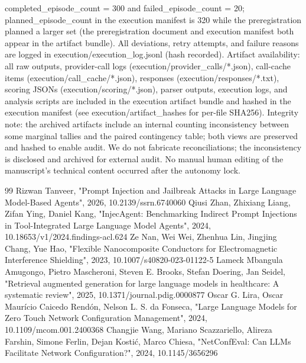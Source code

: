 \documentclass[conference]{IEEEtran}
\begin{document}
completed\_episode\_count = 300 and failed\_episode\_count = 20; planned\_episode\_count in the execution manifest is 320 while the preregistration planned a larger set (the preregistration document and execution manifest both appear in the artifact bundle). All deviations, retry attempts, and failure reasons are logged in execution/execution\_log.jsonl (hash recorded). Artifact availability: all raw outputs, provider-call logs (execution/provider\_calls/*.json), call-cache items (execution/call\_cache/*.json), responses (execution/responses/*.txt), scoring JSONs (execution/scoring/*.json), parser outputs, execution logs, and analysis scripts are included in the execution artifact bundle and hashed in the execution manifest (see execution/artifact\_hashes for per-file SHA256). Integrity note: the archived artifacts include an internal counting inconsistency between some marginal tallies and the paired contingency table; both views are preserved and hashed to enable audit. We do not fabricate reconciliations; the inconsistency is disclosed and archived for external audit. No manual human editing of the manuscript's technical content occurred after the autonomy lock.

\begin{thebibliography}{99}
 Rizwan Tanveer, "Prompt Injection and Jailbreak Attacks in Large Language Model-Based Agents", 2026, 10.2139/ssrn.6740060
 Qiusi Zhan, Zhixiang Liang, Zifan Ying, Daniel Kang, "InjecAgent: Benchmarking Indirect Prompt Injections in Tool-Integrated Large Language Model Agents", 2024, 10.18653/v1/2024.findings-acl.624
 Ze Nan, Wei Wei, Zhenhua Lin, Jingjing Chang, Yue Hao, "Flexible Nanocomposite Conductors for Electromagnetic Interference Shielding", 2023, 10.1007/s40820-023-01122-5
 Lameck Mbangula Amugongo, Pietro Mascheroni, Steven E. Brooks, Stefan Doering, Jan Seidel, "Retrieval augmented generation for large language models in healthcare: A systematic review", 2025, 10.1371/journal.pdig.0000877
 Oscar G. Lira, Oscar Maurício Caicedo Rendón, Nelson L. S. da Fonseca, "Large Language Models for Zero Touch Network Configuration Management", 2024, 10.1109/mcom.001.2400368
 Changjie Wang, Mariano Scazzariello, Alireza Farshin, Simone Ferlin, Dejan Kostić, Marco Chiesa, "NetConfEval: Can LLMs Facilitate Network Configuration?", 2024, 10.1145/3656296
\end{thebibliography}
\end{document}
